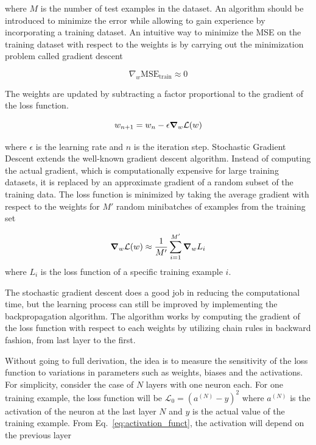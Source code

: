 where $M$ is the number of test examples in the dataset. An algorithm should be
introduced to minimize the error  while allowing to gain
experience by incorporating a training dataset.
An intuitive way to minimize the MSE on the training dataset with respect to
the weights is by carrying out
the minimization problem called gradient descent

\begin{equation}
    \nabla_w \text{MSE}_\text{train} \approx 0
\end{equation}

The weights are updated by subtracting a factor proportional to the
gradient of the loss function.

\begin{equation}
    w_{n+1} = w_n - \epsilon  \grad_w \mathcal{L}(w)
\end{equation}

where $\epsilon$ is the learning rate and $n$ is the iteration step. Stochastic
Gradient Descent extends the well-known gradient descent algorithm. Instead of
computing the
actual gradient, which is computationally expensive for large training
datasets,  it is replaced
by an approximate gradient of a random subset of the training data. The loss
function is minimized by taking  the average gradient with respect to the
weights for $M'$ random minibatches of examples from the training set

\begin{align}
    \grad_w \mathcal{L}(w) \approx \frac{1}{M'} \sum_{i=1}^{M'} \grad_w L_i
\end{align}
where $L_i$ is the loss function of a specific training example $i$.

The stochastic gradient descent does a good job in reducing the computational
time, but the learning process can still be improved by implementing the
backpropagation algorithm. The algorithm works by computing the gradient of
the loss function with respect to each weights by utilizing chain rules in
backward fashion, from last layer to the first.

Without going to full derivation, the idea is to measure the sensitivity of the
loss function  to variations in  parameters such as weights,
biases and the activations.  For simplicity, consider the case of $N$ layers
with one neuron each. For one training example,  the loss function will be
$\mathcal{L}_0 = \left(a^{(N)} - y \right)^2$ where $a^{(N)}$ is the activation
of the
neuron at the last layer $N$ and $y$ is the actual value of the training
example. From Eq.~\eqref{eq:activation_funct}, the activation will depend on
the previous layer


